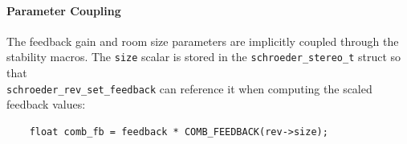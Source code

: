 \paragraph{Parameter Coupling}
\label{sec:schroeder_parameter_coupling}
The feedback gain and room size parameters are implicitly coupled through the stability macros. The \texttt{size} scalar is stored in the \texttt{schroeder\_stereo\_t} struct so that \\ \texttt{schroeder\_rev\_set\_feedback} can reference it when computing the scaled feedback values:
\begin{verbatim}
	float comb_fb = feedback * COMB_FEEDBACK(rev->size);
\end{verbatim}